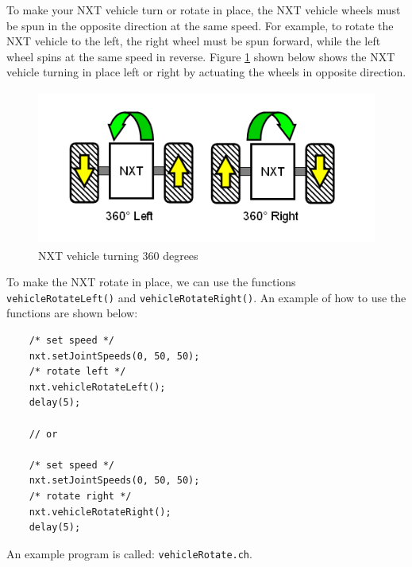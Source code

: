 To make your NXT vehicle turn or rotate in place, the NXT vehicle wheels must be spun in the opposite
direction at the same speed. For example, to rotate the NXT vehicle to the left, the right wheel must
be spun forward, while the left wheel spins at the same speed in reverse. Figure \ref{fig_NXT_360LR} 
shown below shows the NXT vehicle turning in place left or right by actuating the wheels in opposite 
direction.
\begin{figure}[h]
  \begin{center}
    \includegraphics[height=2in]{figure/mindstorm/Vehicle_360LR.png}
    \caption{NXT vehicle turning 360 degrees \label{fig_NXT_360LR}}
  \end{center}
\end{figure}
\noindent
To make the NXT rotate in place, we can use the functions \verb+vehicleRotateLeft()+ 
and \verb+vehicleRotateRight()+.  An example of how to use the functions are shown below:
\begin{verbatim}
    /* set speed */
    nxt.setJointSpeeds(0, 50, 50);
    /* rotate left */
    nxt.vehicleRotateLeft();
    delay(5);
    
    // or
    
    /* set speed */
    nxt.setJointSpeeds(0, 50, 50);
    /* rotate right */
    nxt.vehicleRotateRight();
    delay(5);
\end{verbatim}
\noindent
An example program is called: \verb+vehicleRotate.ch+.


